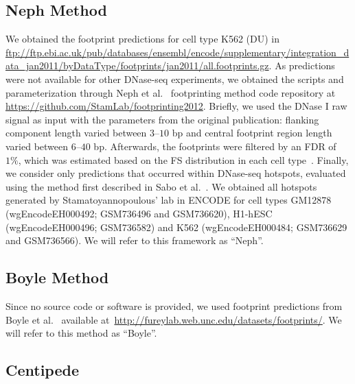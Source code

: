 \subsection{Neph Method}
\label{sec:neph}

We obtained the footprint predictions for cell type K562 (DU) in \url{ftp://ftp.ebi.ac.uk/pub/databases/ensembl/encode/supplementary/integration_data_jan2011/byDataType/footprints/jan2011/all.footprints.gz}. As predictions were not available for other DNase-seq experiments, we obtained the scripts and parameterization through Neph et al.~\cite{neph2012a} footprinting method code repository at \url{https://github.com/StamLab/footprinting2012}. Briefly, we used the DNase I raw signal as input with the parameters from the original publication: flanking component length varied between $3$--$10$ bp and central footprint region length varied between $6$--$40$ bp. Afterwards, the footprints were filtered by an FDR of $1\%$, which was estimated based on the FS distribution in each cell type~\cite{neph2012a}. Finally, we consider only predictions that occurred within DNase-seq hotspots, evaluated using the method first described in Sabo et al.~\cite{sabo2004b}. We obtained all hotspots generated by Stamatoyannopoulous' lab in ENCODE for cell types GM12878 (wgEncodeEH000492; GSM736496 and GSM736620), H1-hESC (wgEncodeEH000496; GSM736582) and K562 (wgEncodeEH000484; GSM736629 and GSM736566). We will refer to this framework as ``Neph''.

\subsection{Boyle Method}
\label{sec:boyle}

Since no source code or software is provided, we used footprint predictions from Boyle et al.~\cite{boyle2011} available at~\url{http://fureylab.web.unc.edu/datasets/footprints/}. We will refer to this method as ``Boyle''.

\subsection{Centipede}
\label{sec:centipede}

